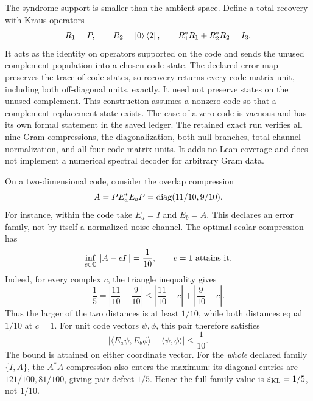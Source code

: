 The syndrome support is smaller than the ambient space. Define a total recovery with Kraus operators
\[
R_1=P,\qquad R_2=\left|0\right\rangle\left\langle2\right|,
\qquad R_1^*R_1+R_2^*R_2=I_3.
\]
It acts as the identity on operators supported on the code and sends the unused complement population into a chosen code state. The declared error map preserves the trace of code states, so recovery returns every code matrix unit, including both off-diagonal units, exactly. It need not preserve states on the unused complement.
This construction assumes a nonzero code so that a complement replacement state exists. The case of a zero code is vacuous and has its own formal statement in the saved ledger. The retained exact run verifies all nine Gram compressions, the diagonalization, both null branches, total channel normalization, and all four code matrix units. It adds no Lean coverage and does not implement a numerical spectral decoder for arbitrary Gram data.

On a two-dimensional code, consider the overlap compression
\[
A=PE_a^*E_bP=\operatorname{diag}(11/10,9/10).
\]
For instance, within the code take $E_a=I$ and $E_b=A$. This declares an error family, not by itself a normalized noise channel. The optimal scalar compression has
\[
\inf_{c\in\CC}\norm{A-cI}=\frac1{10},\qquad c=1\ \text{attains it}.
\]
Indeed, for every complex $c$, the triangle inequality gives
\[
\frac15=\left|\frac{11}{10}-\frac9{10}\right|
\leq\left|\frac{11}{10}-c\right|+\left|\frac9{10}-c\right|.
\]
Thus the larger of the two distances is at least $1/10$, while both distances equal $1/10$ at $c=1$.
For unit code vectors $\psi,\phi$, this pair therefore satisfies
\[
\left|\langle E_a\psi,E_b\phi\rangle-\langle\psi,\phi\rangle\right|
\leq\frac1{10}.
\]
The bound is attained on either coordinate vector. For the \emph{whole} declared family $\{I,A\}$, the $A^*A$ compression also enters the maximum: its diagonal entries are $121/100,81/100$, giving pair defect $1/5$. Hence the full family value is $\varepsilon_{\rm KL}=1/5$, not $1/10$.

